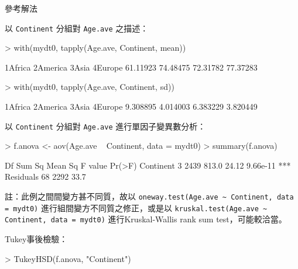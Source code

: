 \documentclass[14pt, aspectratio=43]{beamer}
\begin{document}
\begin{frame}{參考解法}
\framebreak

以 \verb+Continent+ 分組對 \verb+Age.ave+ 之描述：
\begin{RC}
> with(mydt0, {tapply(Age.ave, Continent, mean)})
\end{RC}
\begin{R}
 1Africa 2America    3Asia  4Europe 
61.11923 74.48475 72.31782 77.37283 
\end{R}
\begin{RC}
> with(mydt0, {tapply(Age.ave, Continent, sd)})
\end{RC}
\begin{R}
 1Africa 2America    3Asia  4Europe 
9.308895 4.014003 6.383229 3.820449
\end{R}

\framebreak

以 \verb+Continent+ 分組對 \verb+Age.ave+ 進行單因子變異數分析：
\begin{RC}
> f.anova <- aov(Age.ave ~ Continent, data = mydt0)
> summary(f.anova)
\end{RC}
\begin{R}
            Df Sum Sq Mean Sq F value   Pr(>F)    
Continent    3   2439   813.0   24.12 9.66e-11 ***
Residuals   68   2292    33.7                     
\end{R}

\begin{minipage}{1\textwidth}
\tiny 註：此例之間間變方甚不同質，故以 \verb+oneway.test(Age.ave ~ Continent, data = mydt0)+ 進行組間變方不同質之修正，或是以 \verb+kruskal.test(Age.ave ~ Continent, data = mydt0)+ 進行Kruskal-Wallis rank sum test，可能較洽當。
\end{minipage}

\framebreak

Tukey事後檢驗：
\begin{RC}
> TukeyHSD(f.anova, "Continent")
\end{RC}


\end{frame}
\end{document}
